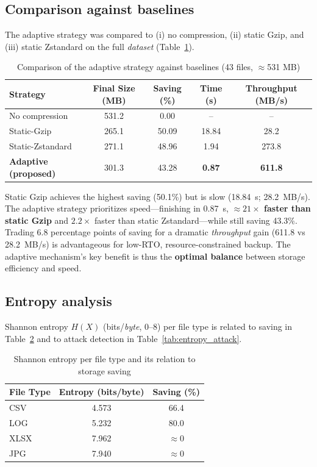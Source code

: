 \documentclass{iaesarticle}
\begin{document}
\subsection{Comparison against baselines}
The adaptive strategy was compared to (i) no compression, (ii) static Gzip, and (iii) static Zstandard on the full \textit{dataset} (Table~\ref{tab:baseline_comparison}).

\begin{table}[H]
\centering
\fontsize{8pt}{10pt}\selectfont
\caption{Comparison of the adaptive strategy against baselines (43 files, $\approx$531 MB)}
\label{tab:baseline_comparison}
\begin{tabular}{l c c c c}
\hline
\textbf{Strategy} & \textbf{Final Size (MB)} & \textbf{Saving (\%)} & \textbf{Time (s)} & \textbf{Throughput (MB/s)} \\
\hline
No compression        & 531.2 & 0.00  & --    & -- \\
Static-Gzip           & 265.1 & 50.09 & 18.84 & 28.2 \\
Static-Zstandard      & 271.1 & 48.96 & 1.94  & 273.8 \\
\textbf{Adaptive (proposed)} & 301.3 & 43.28 & \textbf{0.87} & \textbf{611.8} \\
\hline
\end{tabular}
\end{table}

Static Gzip achieves the highest saving (50.1\%) but is slow (18.84~s; 28.2~MB/s). The adaptive strategy prioritizes speed---finishing in 0.87~s, \textbf{$\approx21\times$ faster than static Gzip} and $2.2\times$ faster than static Zstandard---while still saving 43.3\%. Trading 6.8 percentage points of saving for a dramatic \textit{throughput} gain (611.8 vs 28.2~MB/s) is advantageous for low-RTO, resource-constrained backup. The adaptive mechanism's key benefit is thus the \textbf{optimal balance} between storage efficiency and speed.

\subsection{Entropy analysis}
Shannon entropy $H(X)$ (bits/\textit{byte}, 0--8) per file type is related to saving in Table~\ref{tab:entropy_type} and to attack detection in Table~\ref{tab:entropy_attack}.

\begin{table}[H]
\centering
\fontsize{8pt}{10pt}\selectfont
\caption{Shannon entropy per file type and its relation to storage saving}
\label{tab:entropy_type}
\begin{tabular}{l c c}
\hline
\textbf{File Type} & \textbf{Entropy (bits/byte)} & \textbf{Saving (\%)} \\
\hline
CSV  & 4.573 & 66.4 \\
LOG  & 5.232 & 80.0 \\
XLSX & 7.962 & $\approx$0 \\
JPG  & 7.940 & $\approx$0 \\
\hline
\end{tabular}
\end{table}
\end{document}

